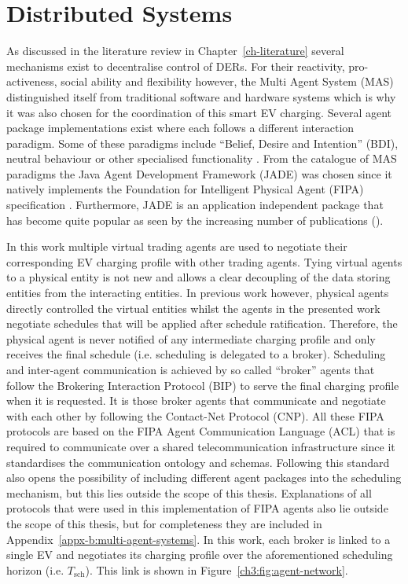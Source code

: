 \section{Distributed Systems}
\label{ch3:sec:distributed-systems}

As discussed in the literature review in Chapter~\ref{ch-literature} several mechanisms exist to decentralise control of DERs.
For their reactivity, pro-activeness, social ability and flexibility however, the Multi Agent System (MAS) distinguished itself from traditional software and hardware systems which is why it was also chosen for the coordination of this smart EV charging.
Several agent package implementations exist where each follows a different interaction paradigm.
Some of these paradigms include ``Belief, Desire and Intention'' (BDI), neutral behaviour or other specialised functionality \cite{Luck2004}.
From the catalogue of MAS paradigms the Java Agent Development Framework (JADE) was chosen since it natively implements the Foundation for Intelligent Physical Agent (FIPA) specification \cite{JADE-website, FIPA-agent-specs}.
Furthermore, JADE is an application independent package that has become quite popular as seen by the increasing number of publications (\cite{Karfopoulos2013, Eddy2011, Kuo2013, Mocci2014, Li2017}).

In this work multiple virtual trading agents are used to negotiate their corresponding EV charging profile with other trading agents.
Tying virtual agents to a physical entity is not new \cite{Dimeas2005, Nguyen2011, Nagata2011, Nagata2012} and allows a clear decoupling of the data storing entities from the interacting entities.
In previous work however, physical agents directly controlled the virtual entities whilst the agents in the presented work negotiate schedules that will be applied after schedule ratification.
Therefore, the physical agent is never notified of any intermediate charging profile and only receives the final schedule (i.e. scheduling is delegated to a broker).
Scheduling and inter-agent communication is achieved by so called ``broker'' agents that follow the Brokering Interaction Protocol (BIP) to serve the final charging profile when it is requested.
It is those broker agents that communicate and negotiate with each other by following the Contact-Net Protocol (CNP).
All these FIPA protocols are based on the FIPA Agent Communication Language (ACL) that is required to communicate over a shared telecommunication infrastructure since it standardises the communication ontology and schemas.
Following this standard also opens the possibility of including different agent packages into the scheduling mechanism, but this lies outside the scope of this thesis.
Explanations of all protocols that were used in this implementation of FIPA agents also lie outside the scope of this thesis, but for completeness they are included in Appendix~\ref{appx-b:multi-agent-systems}.
In this work, each broker is linked to a single EV and negotiates its charging profile over the aforementioned scheduling horizon (i.e. $T_\text{sch}$).
This link is shown in Figure~\ref{ch3:fig:agent-network}.

